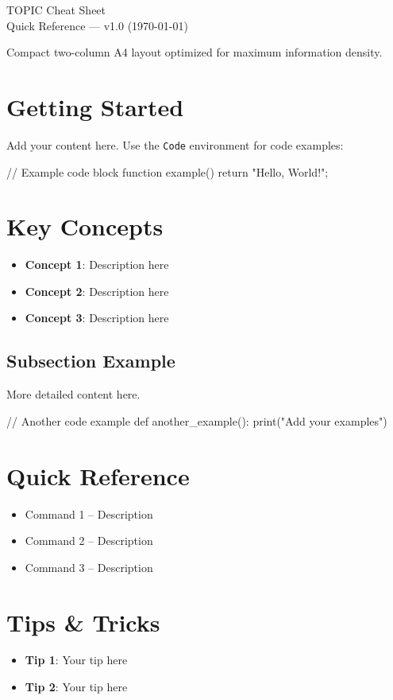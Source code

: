 \documentclass[8pt,a4paper,twocolumn]{extarticle}
\begin{document}
\begin{center}
{\Large {{TOPIC}} Cheat Sheet}\\
{\footnotesize Quick Reference --- v1.0 (\today)}
\end{center}

\vspace{2mm}

{\footnotesize Compact two-column A4 layout optimized for maximum information density.}

\section{Getting Started}

Add your content here. Use the \texttt{Code} environment for code examples:

\begin{Code}
// Example code block
function example() {
    return "Hello, World!";
}
\end{Code}

\section{Key Concepts}

\begin{itemize}
  \item \textbf{Concept 1}: Description here
  \item \textbf{Concept 2}: Description here
  \item \textbf{Concept 3}: Description here
\end{itemize}

\subsection{Subsection Example}

More detailed content here.

\begin{Code}
// Another code example
def another_example():
    print("Add your examples")
\end{Code}

\section{Quick Reference}

\begin{itemize}
  \item Command 1 -- Description
  \item Command 2 -- Description
  \item Command 3 -- Description
\end{itemize}

\section{Tips \& Tricks}

\begin{itemize}
  \item \textbf{Tip 1}: Your tip here
  \item \textbf{Tip 2}: Your tip here
\end{itemize}

\end{document}
